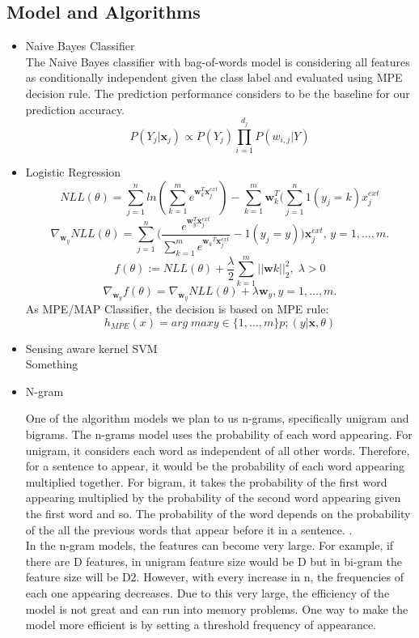 \documentclass[a4paper, 11pt]{article}
\begin{document}
\subsection{Model and Algorithms}
\begin{itemize}
	\item Naive Bayes Classifier\\
	The Naive Bayes classifier with bag-of-words model is considering all features as conditionally independent given the class label and evaluated using MPE decision rule. The prediction performance considers to be the baseline for our prediction accuracy.
	\[P(Y_j|\pmb{x}_j) \propto P(Y_j)\prod^{d_j}_{i=1}P(w_{i,j}|Y)\]
	\item Logistic Regression \\

	\[NLL(\theta) = \sum_{j=1}^{n}ln(\sum_{k=1}^{m}e^{\pmb{w}_k^T\pmb{x}^{ext}_j})-\sum_{k=1}^{m}\pmb{w}_{k}^{T}(\sum_{j=1}^n 1(y_j=k)x^{ext}_{j}\]
	\[\nabla_{\pmb{w}_y}NLL(\theta) = \sum_{j=1}^{n}\bigg(\frac{e^{\pmb{w}_y^T\pmb{x}_j^{ext}}}{\sum_{k=1}^{m}e^{{\pmb{w}_k}^T\pmb{x}_j^{ext}}}-1(y_j = y)\bigg)\pmb{x}^{ext}_{j},\,y=1,\ldots,m.\]
	\[f(\theta):=NLL(\theta)+\frac{\lambda}{2}\sum_{k=1}^{m}||\pmb{w}{k}||^2_2,\; \lambda>0\]
	\[\nabla_{\pmb{w}_y}f(\theta) = \nabla_{\pmb{w}_y}NLL(\theta)+\lambda\pmb{w}_{y},y=1,\ldots,m.\]
	As MPE/MAP Classifier, the decision is based on MPE rule:\[h_{MPE}(x) = arg \; max{y \in\{1,\ldots,m\}p;(y|\pmb{x},\theta)}\]
	\item Sensing aware kernel SVM\\
	Something
	\item N-gram
	\par One of the algorithm models we plan to us n-grams, specifically unigram and bigrams.  The n-grams model uses the probability of each word appearing. For unigram, it considers each word as independent of all other words. Therefore, for a sentence to appear, it would be the probability of each word appearing multiplied together. For bigram, it takes the probability of the first word appearing multiplied by the probability of the second word appearing given the first word and so. The probability of the word depends on the probability of the all the previous words that appear before it in a sentence. \cite{song1999general}. \\
	
	In the n-gram models, the features can become very large. For example, if there are D features, in unigram feature size would be D but in bi-gram the feature size will be D2. However, with every increase in n, the frequencies of each one appearing decreases. Due to this very large, the efficiency of the model is not great and can run into memory problems. One way to make the model more efficient is by setting a threshold frequency of appearance\cite{furnkranz1998study}.  \\
	

\end{itemize}
\end{document}
